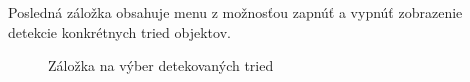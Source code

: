         Posledná záložka obsahuje menu z možnosťou zapnúť a vypnúť zobrazenie detekcie konkrétnych tried objektov. 

        \begin{figure}[H]
            \centering
            \caption{Záložka na výber detekovaných tried}
        \end{figure}